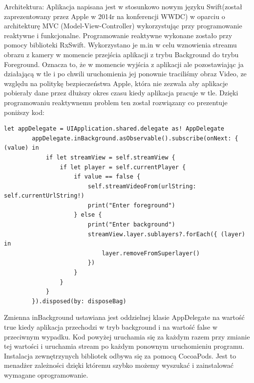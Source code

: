 Architektura:
Aplikacja napisana jest w stosunkowo nowym języku Swift(został zaprezentowany przez Apple w 2014r na konferencji WWDC) w oparciu o architekturę MVC (Model-View-Controller) wykorzystując przy programowanie reaktywne i funkcjonalne. 
Programowanie reaktywne wykonane zostało przy pomocy biblioteki RxSwift. Wykorzystano je m.in w celu wznowienia streamu obrazu z kamery w momencie przejścia aplikacji z trybu Background do trybu Foreground. Oznacza to, że w momencie wyjścia z aplikacji ale pozostawiając ja działającą w tle i po chwili uruchomienia jej ponownie traciliśmy obraz Video, ze względu na politykę bezpieczeństwa Apple, która nie zezwala aby aplikacje pobierały dane przez dłuższy okres czasu kiedy aplikacja pracuje w tle. Dzięki programowaniu reaktywnemu problem ten został rozwiązany co prezentuje poniższy kod:
\begin{verbatim}
let appDelegate = UIApplication.shared.delegate as! AppDelegate
        appDelegate.inBackground.asObservable().subscribe(onNext: { (value) in
            if let streamView = self.streamView {
                if let player = self.currentPlayer {
                    if value == false {
                        self.streamVideoFrom(urlString: self.currentUrlString!)
                        print("Enter foreground")
                    } else {
                        print("Enter background")
                        streamView.layer.sublayers?.forEach({ (layer) in
                            layer.removeFromSuperlayer()
                        })
                    }
                }
            }
        }).disposed(by: disposeBag)
\end{verbatim}
Zmienna inBackground ustawiana jest oddzielnej klasie AppDelegate na wartość true kiedy aplikacja przechodzi w tryb background i na wartość false w przeciwnym wypadku. Kod powyżej uruchamia się za każdym razem przy zmianie tej wartości i uruchamia stream po każdym ponownym uruchomieniu programu.
Instalacja zewnętrzynych bibliotek odbywa się za pomocą CocoaPods. Jest to menadżer zależności dzięki któremu szybko możemy wyszukać i zainstalować wymagane oprogramowanie.

